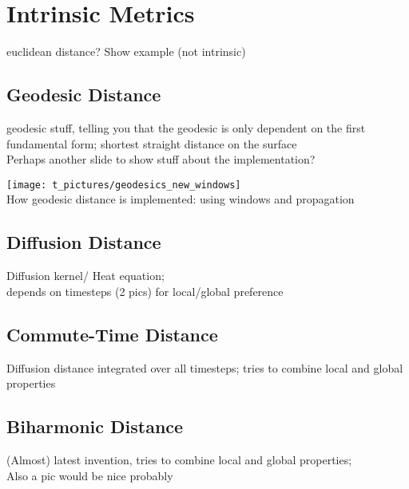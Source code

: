 \documentclass[]{beamer}
\begin{document}
\section{Intrinsic Metrics}
	\begin{frame}
		euclidean distance? Show example (not intrinsic)
	\end{frame}

\subsection{Geodesic Distance}
	\begin{frame}
		geodesic stuff, telling you that the geodesic is only dependent on the
		first fundamental form; shortest straight distance on the surface\\
		Perhaps another slide to show stuff about the implementation?
	\end{frame}

	\begin{frame}
		\texttt{[image: t\_pictures/geodesics\_new\_windows]} \\
		How geodesic distance is implemented: using windows and propagation
	\end{frame}

\subsection{Diffusion Distance}
	\begin{frame}
		Diffusion kernel/ Heat equation; \\
		depends on timesteps (2 pics) for local/global preference
	\end{frame}

\subsection{Commute-Time Distance}
	\begin{frame}
		Diffusion distance integrated over all timesteps; tries to combine local
		and global properties
	\end{frame}

\subsection{Biharmonic Distance}
	\begin{frame}
		(Almost) latest invention, tries to combine local and global properties;\\
		Also a pic would be nice probably
	\end{frame}
\end{document}

